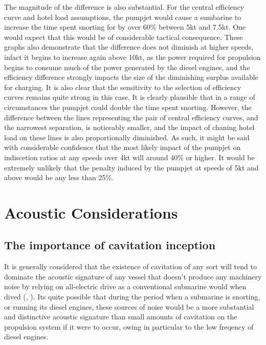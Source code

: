\documentclass{article}\usepackage[]{graphicx}\usepackage[]{color}
\begin{document}
The magnitude of the difference is also substantial.  For the central efficiency curve and hotel load assumptions, the pumpjet would cause a sumbarine to increase the time spent snorting for by over 60\% between 5kt and 7.5kt.  One would expect that this would be of considerable tactical consequence. These graphs also demonstrate that the difference does not diminish at higher speeds, infact it begins to increase again above 10kt, as the power required for propulsion begins to consume much of the power generated by the diesel engines, and the efficiency difference strongly impacts the size of the diminishing surplus available for charging.  It is also clear that the sensitivity to the selection of efficiency curves remains quite strong in this case.  It is clearly plausible that in a range of circumstances the pumpjet could double the time spent snorting.  However, the difference between the lines representing the pair of central efficiency curves, and the narrowest separation, is noticeably smaller, and the impact of chaning hotel load on these lines is also proportionally diminished.  As such, it might be said with considerable confidence that the most likely impact of the pumpjet on indiscetion ratios at any speeds over 4kt will around 40\% or higher.  It would be extremely unlikely that the penalty induced by the pumpjet at speeds of 5kt and above would be any less than 25\%.



\newpage  \section{Acoustic Considerations} \label{acousticconsiderations}

\subsection{The importance of cavitation inception}
It is generally considered that the existence of cavitation of any sort will tend to dominate the acoustic signature of any vessel that doesn't produce any machinery noise by relying on all-electric drive as a conventional submarine would when dived (\cite{giles2010}, \cite{harvie1965construction}).  Its quite possible that during the period when a submarine is snorting, or running its diesel engines, these sources of noise would be a more substantial and distinctive acoustic signature than small amounts of cavitation on the propulsion system if it were to occur, owing in particular to the low freqency of diesel engines.
\end{document}

